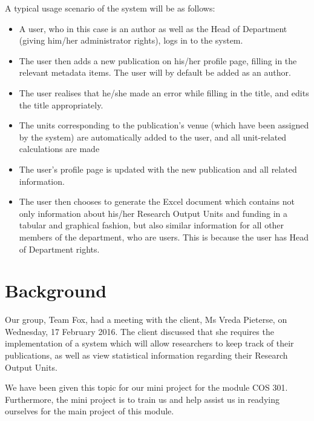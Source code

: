 \documentclass[a4paper,12pt]{article}
\begin{document}
A typical usage scenario of the system will be as follows:
\begin{itemize}

\item A user, who in this case is an author as well as the Head of Department (giving him/her administrator rights), logs in to the system.
\item The user then adds a new publication on his/her profile page, filling in the relevant metadata items. The user will by default be added as an author.
\item The user realises that he/she made an error while filling in the title, and edits the title appropriately.
\item The units corresponding to the publication's venue (which have been assigned by the system) are automatically added to the user, and all unit-related calculations are made
\item The user's profile page is updated with the new publication and all related information.
\item The user then chooses to generate the Excel document which contains not only information about his/her Research Output Units and funding in a tabular and graphical fashion, but also similar information for all other members of the department, who are users. This is because the user has Head of Department rights. 

\end{itemize}

\newpage
\section{Background}

Our group, Team Fox, had a meeting with the client, Ms Vreda Pieterse, on Wednesday, 17 February 2016. The client discussed that she requires the implementation of a system which will allow researchers to keep track of their publications, as well as view statistical information regarding their Research Output Units.

We have been given this topic for our mini project for the module COS 301. Furthermore, the mini project is to train us and help assist us in readying ourselves for the main project of this module.
\end{document}

